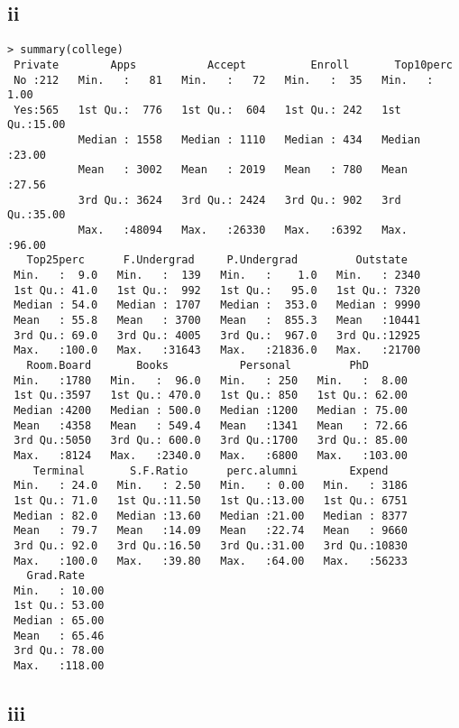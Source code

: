 \documentclass{article}
\begin{document}
\subsection*{ii}
\begin{verbatim}
> summary(college)
 Private        Apps           Accept          Enroll       Top10perc    
 No :212   Min.   :   81   Min.   :   72   Min.   :  35   Min.   : 1.00  
 Yes:565   1st Qu.:  776   1st Qu.:  604   1st Qu.: 242   1st Qu.:15.00  
           Median : 1558   Median : 1110   Median : 434   Median :23.00  
           Mean   : 3002   Mean   : 2019   Mean   : 780   Mean   :27.56  
           3rd Qu.: 3624   3rd Qu.: 2424   3rd Qu.: 902   3rd Qu.:35.00  
           Max.   :48094   Max.   :26330   Max.   :6392   Max.   :96.00  
   Top25perc      F.Undergrad     P.Undergrad         Outstate    
 Min.   :  9.0   Min.   :  139   Min.   :    1.0   Min.   : 2340  
 1st Qu.: 41.0   1st Qu.:  992   1st Qu.:   95.0   1st Qu.: 7320  
 Median : 54.0   Median : 1707   Median :  353.0   Median : 9990  
 Mean   : 55.8   Mean   : 3700   Mean   :  855.3   Mean   :10441  
 3rd Qu.: 69.0   3rd Qu.: 4005   3rd Qu.:  967.0   3rd Qu.:12925  
 Max.   :100.0   Max.   :31643   Max.   :21836.0   Max.   :21700  
   Room.Board       Books           Personal         PhD        
 Min.   :1780   Min.   :  96.0   Min.   : 250   Min.   :  8.00  
 1st Qu.:3597   1st Qu.: 470.0   1st Qu.: 850   1st Qu.: 62.00  
 Median :4200   Median : 500.0   Median :1200   Median : 75.00  
 Mean   :4358   Mean   : 549.4   Mean   :1341   Mean   : 72.66  
 3rd Qu.:5050   3rd Qu.: 600.0   3rd Qu.:1700   3rd Qu.: 85.00  
 Max.   :8124   Max.   :2340.0   Max.   :6800   Max.   :103.00  
    Terminal       S.F.Ratio      perc.alumni        Expend     
 Min.   : 24.0   Min.   : 2.50   Min.   : 0.00   Min.   : 3186  
 1st Qu.: 71.0   1st Qu.:11.50   1st Qu.:13.00   1st Qu.: 6751  
 Median : 82.0   Median :13.60   Median :21.00   Median : 8377  
 Mean   : 79.7   Mean   :14.09   Mean   :22.74   Mean   : 9660  
 3rd Qu.: 92.0   3rd Qu.:16.50   3rd Qu.:31.00   3rd Qu.:10830  
 Max.   :100.0   Max.   :39.80   Max.   :64.00   Max.   :56233  
   Grad.Rate     
 Min.   : 10.00  
 1st Qu.: 53.00  
 Median : 65.00  
 Mean   : 65.46  
 3rd Qu.: 78.00  
 Max.   :118.00
\end{verbatim}
\subsection*{iii}


\end{document}
